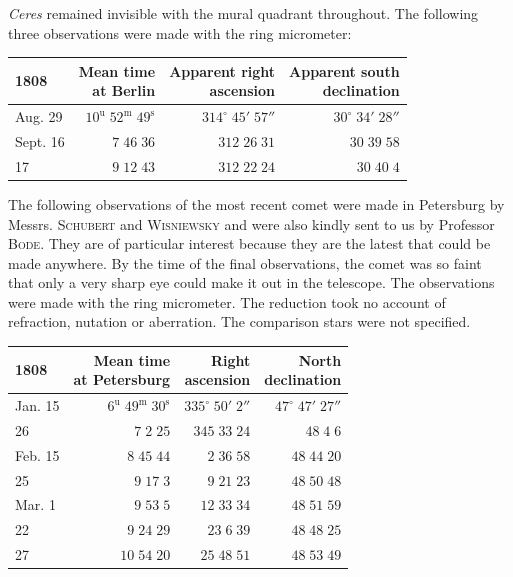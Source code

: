 \par\indent \emph{Ceres} remained invisible with the mural quadrant throughout. The following three observations were made with the ring micrometer:


\begin{center}\fontsize{10}{12}\selectfont\setlength{\tabcolsep}{5pt}\renewcommand{\arraystretch}{1.15}\begin{tabular}{lrrr}
1808 & \shortstack{Mean time\\at Berlin} & \shortstack{Apparent right\\ascension} & \shortstack{Apparent south\\declination}\\
\hline
Aug. 29 & $10^{\text{u}}\;52^{\text{m}}\;49^{\text{s}}$ & $314^\circ\;45'\;57''$ & $30^\circ\;34'\;28''$\\
Sept. 16 & $7\;46\;36$ & $312\;26\;31$ & $30\;39\;58$\\
17 & $9\;12\;43$ & $312\;22\;24$ & $30\;40\;4$\\
\end{tabular}\end{center}


\par\indent The following observations of the most recent comet were made in Petersburg by Messrs. \textsc{Schubert} and \textsc{Wisniewsky} and were also kindly sent to us by Professor \textsc{Bode}. They are of particular interest because they are the latest that could be made anywhere. By the time of the final observations, the comet was so faint that only a very sharp eye could make it out in the telescope. The observations were made with the ring micrometer. The reduction took no account of refraction, nutation or aberration. The comparison stars were not specified.


\begin{center}\fontsize{10}{12}\selectfont\setlength{\tabcolsep}{5pt}\renewcommand{\arraystretch}{1.15}\begin{tabular}{lrrr}
1808 & \shortstack{Mean time\\at Petersburg} & \shortstack{Right\\ascension} & \shortstack{North\\declination}\\
\hline
Jan. 15 & $6^{\text{u}}\;49^{\text{m}}\;30^{\text{s}}$ & $335^\circ\;50'\;2''$ & $47^\circ\;47'\;27''$\\
26 & $7\;2\;25$ & $345\;33\;24$ & $48\;4\;6$\\
Feb. 15 & $8\;45\;44$ & $2\;36\;58$ & $48\;44\;20$\\
25 & $9\;17\;3$ & $9\;21\;23$ & $48\;50\;48$\\
Mar. 1 & $9\;53\;5$ & $12\;33\;34$ & $48\;51\;59$\\
22 & $9\;24\;29$ & $23\;6\;39$ & $48\;48\;25$\\
27 & $10\;54\;20$ & $25\;48\;51$ & $48\;53\;49$\\
\end{tabular}\end{center}


